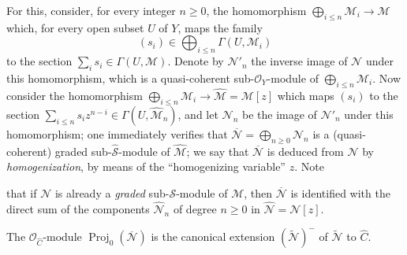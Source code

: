 \begin{env}[8.13.2]
\label{II.8.13.2}
For this, consider, for every integer $n\geqslant0$, the homomorphism
$\bigoplus_{i\leqslant n}\mathcal{M}_i\to\mathcal{M}$ which, for every open
subset $U$ of $Y$, maps the family
\[
  (s_i)\in\bigoplus_{i\leqslant n}\Gamma(U,\mathcal{M}_i)
\]
to the section $\sum_i s_i\in\Gamma(U,\mathcal{M})$. Denote by
$\mathcal{N}'_n$ the inverse image of $\mathcal{N}$ under this homomorphism,
which is a quasi-coherent sub-$\mathcal{O}_Y$-module of
$\bigoplus_{i\leqslant n}\mathcal{M}_i$. Now consider the
homomorphism
$\bigoplus_{i\leqslant n}\mathcal{M}_i\to
\widehat{\mathcal{M}}=\mathcal{M}[z]$ which maps $(s_i)$ to the
section
$\sum_{i\leqslant n}s_i z^{n-i}\in\Gamma(U,\widehat{\mathcal{M}}_n)$, and
let $\mathcal{N}_n$ be the image of $\mathcal{N}'_n$ under this homomorphism;
one immediately verifies that
$\overline{\mathcal{N}}=\bigoplus_{n\geqslant0}\mathcal{N}_n$ is a
(quasi-coherent) graded sub-$\widehat{\mathcal{S}}$-module of
$\widehat{\mathcal{M}}$; we say that $\overline{\mathcal{N}}$ is deduced from
$\mathcal{N}$ by \emph{homogenization}, by means of the ``homogenizing
variable'' $z$. Note

that if $\mathcal{N}$ is already a \emph{graded} sub-$\mathcal{S}$-module of
$\mathcal{M}$, then $\overline{\mathcal{N}}$ is identified with the direct
sum of the components $\widehat{\mathcal{N}}_n$ of degree $n\geqslant0$ in
$\widehat{\mathcal{N}}=\mathcal{N}[z]$.
\end{env}

\begin{proposition}[8.13.3]
\label{II.8.13.3}
The $\mathcal{O}_{\widehat{C}}$-module
$\operatorname{Proj}_0(\overline{\mathcal{N}})$ is the canonical extension
$(\widetilde{\mathcal{N}})^{-}$ of $\widetilde{\mathcal{N}}$ to
$\widehat{C}$.
\end{proposition}

